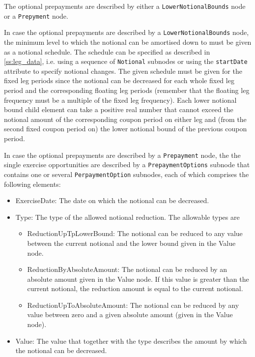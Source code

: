 The optional prepayments are described by either a \verb+LowerNotionalBounds+ node or a \verb+Prepyment+ node.

In case the optional prepayments are described by a \verb+LowerNotionalBounds+ node, the minimum level to which the
notional can be amortised down to must be given as a notional schedule. The schedule can be specified as described in
\ref{ss:leg_data}, i.e. using a sequence of \verb+Notional+ subnodes or using the \verb+startDate+ attribute to specify
notional changes. The given schedule must be given for the fixed leg periods since the notional can be decreased for
each whole fixed leg period and the corresponding floating leg periods (remember that the floating leg frequency must be
a multiple of the fixed leg frequency). Each lower notional bound child element can take a positive real number that
cannot exceed the notional amount of the corresponding coupon period on either leg and (from the second fixed coupon
period on) the lower notional bound of the previous coupon period.

In case the optional prepayments are described by a \verb+Prepayment+ node, the the single exercise opportunities are
described by a \verb+PrepaymentOptions+ subnode that contains one or several \verb+PerpaymentOption+ subnodes, each of
which comprises the following elements:

\begin{itemize}
\item ExerciseDate: The date on which the notional can be decreased.
\item Type: The type of the allowed notional reduction. The allowable types are
  \begin{itemize}
    \item ReductionUpTpLowerBound: The notional can be reduced to any value between the current notional and the
      lower bound given in the Value node.
    \item ReductionByAbsoluteAmount: The notional can be reduced by an absolute amount given in the Value node. If this
      value is greater than the current notional, the reduction amount is equal to the current notional.
    \item ReductionUpToAbsoluteAmount: The notional can be reduced by any value between zero and a
      given absolute amount (given in the Value node).
  \end{itemize}
\item Value: The value that together with the type describes the amount by which the notional can be decreased.
\end{itemize}


